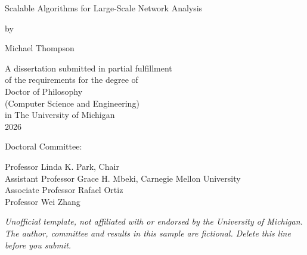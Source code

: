 \begin{titlepage}
\centering
\vspace*{1in}%
{\large Scalable Algorithms for Large-Scale Network Analysis\par}
\vspace{0.4in}
by\par
\vspace{0.3in}
Michael Thompson\par
\vspace{0.5in}
\begin{singlespace}
A dissertation submitted in partial fulfillment\\
of the requirements for the degree of\\
Doctor of Philosophy\\
(Computer Science and Engineering)\\
in The University of Michigan\\
2026
\end{singlespace}
\vfill
\begin{flushleft}
\begin{singlespace}
Doctoral Committee:\\[4pt]
\hspace*{0.5in}\begin{minipage}[t]{5in}
Professor Linda K. Park, Chair\\
Assistant Professor Grace H. Mbeki, Carnegie Mellon University\\
Associate Professor Rafael Ortiz\\
Professor Wei Zhang
\end{minipage}
\end{singlespace}
\end{flushleft}
\vspace{0.3in}
{\footnotesize\itshape Unofficial template, not affiliated with or endorsed by the University of Michigan. The author, committee and results in this sample are fictional. Delete this line before you submit.}
\end{titlepage}
